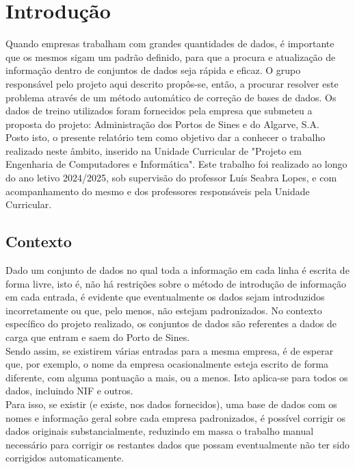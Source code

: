 \documentclass[a4paper,12pt]{article}
\begin{document}

\newpage
\maketitle
\tableofcontents
\newpage

\section{Introdução}
Quando empresas trabalham com grandes quantidades de dados, é importante que os mesmos sigam um padrão definido, para que a procura e atualização de informação dentro de conjuntos de dados seja rápida e eficaz. O grupo responsável pelo projeto aqui descrito propôs-se, então, a procurar resolver este problema através de um método automático de correção de bases de dados. Os dados de treino utilizados foram fornecidos pela empresa que submeteu a proposta do projeto: Administração dos Portos de Sines e do Algarve, S.A.
\\
Posto isto, o presente relatório tem como objetivo dar a conhecer o trabalho realizado neste âmbito, inserido na Unidade Curricular de "Projeto em Engenharia de Computadores e Informática". Este trabalho foi realizado ao longo do ano letivo 2024/2025, sob supervisão do professor Luís Seabra Lopes, e com acompanhamento do mesmo e dos professores responsáveis pela Unidade Curricular.
\subsection{Contexto}
Dado um conjunto de dados no qual toda a informação em cada linha é escrita de forma livre, isto é, não há restrições sobre o método de introdução de informação em cada entrada, é evidente que eventualmente os dados sejam introduzidos incorretamente ou que, pelo menos, não estejam padronizados. No contexto específico do projeto realizado, os conjuntos de dados são referentes a dados de carga que entram e saem do Porto de Sines.
\\
Sendo assim, se existirem várias entradas para a mesma empresa, é de esperar que, por exemplo, o nome da empresa ocasionalmente esteja escrito de forma diferente, com alguma pontuação a mais, ou a menos. Isto aplica-se para todos os dados, incluindo NIF e outros.
\\
Para isso, se existir (e existe, nos dados fornecidos), uma base de dados com os nomes e informação geral sobre cada empresa padronizados, é possível corrigir os dados originais substancialmente, reduzindo em massa o trabalho manual necessário para corrigir os restantes dados que possam eventualmente não ter sido corrigidos automaticamente.
\end{document}

